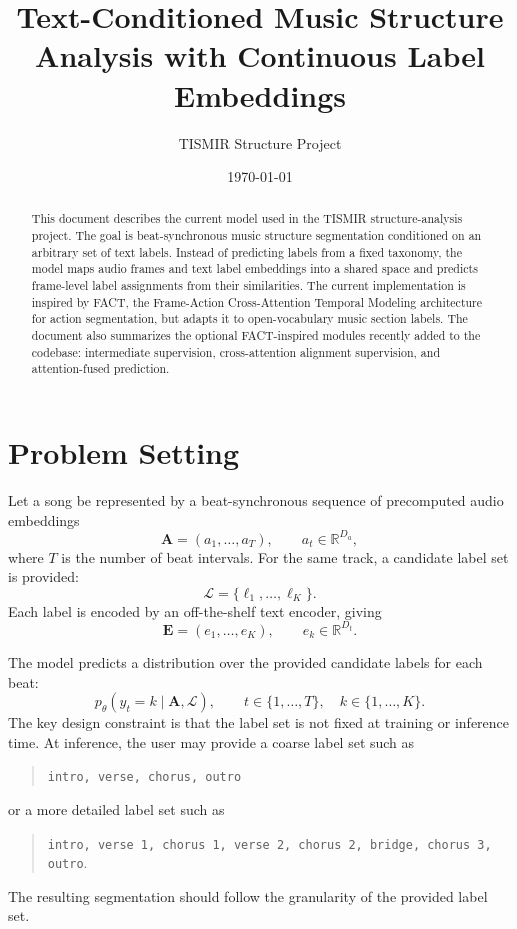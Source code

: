 \documentclass[11pt,a4paper]{article}
\title{Text-Conditioned Music Structure Analysis with Continuous Label Embeddings}
\author{TISMIR Structure Project}
\date{\today}
\newcommand{\audioseq}{\mathbf{A}}
\newcommand{\textset}{\mathbf{E}}
\newcommand{\labels}{\mathcal{L}}
\begin{document}
\maketitle

\begin{abstract}
This document describes the current model used in the TISMIR structure-analysis project.
The goal is beat-synchronous music structure segmentation conditioned on an arbitrary
set of text labels. Instead of predicting labels from a fixed taxonomy, the model maps
audio frames and text label embeddings into a shared space and predicts frame-level
label assignments from their similarities. The current implementation is inspired by
FACT, the Frame-Action Cross-Attention Temporal Modeling architecture for action
segmentation, but adapts it to open-vocabulary music section labels. The document also
summarizes the optional FACT-inspired modules recently added to the codebase:
intermediate supervision, cross-attention alignment supervision, and attention-fused
prediction.
\end{abstract}

\section{Problem Setting}

Let a song be represented by a beat-synchronous sequence of precomputed audio
embeddings
\begin{equation}
  \audioseq = (a_1,\ldots,a_T), \qquad a_t \in \mathbb{R}^{D_a},
\end{equation}
where $T$ is the number of beat intervals. For the same track, a candidate label set is
provided:
\begin{equation}
  \labels = \{\ell_1,\ldots,\ell_K\}.
\end{equation}
Each label is encoded by an off-the-shelf text encoder, giving
\begin{equation}
  \textset = (e_1,\ldots,e_K), \qquad e_k \in \mathbb{R}^{D_t}.
\end{equation}

The model predicts a distribution over the provided candidate labels for each beat:
\begin{equation}
  p_\theta(y_t = k \mid \audioseq, \labels), \qquad t \in \{1,\ldots,T\}, \quad
  k \in \{1,\ldots,K\}.
\end{equation}
The key design constraint is that the label set is not fixed at training or inference
time. At inference, the user may provide a coarse label set such as
\begin{quote}
\texttt{intro, verse, chorus, outro}
\end{quote}
or a more detailed label set such as
\begin{quote}
\texttt{intro, verse 1, chorus 1, verse 2, chorus 2, bridge, chorus 3, outro}.
\end{quote}
The resulting segmentation should follow the granularity of the provided label set.
\end{document}
